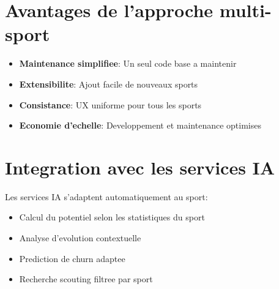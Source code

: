 \section{Avantages de l'approche multi-sport}

\begin{itemize}[leftmargin=*]
  \item \textbf{Maintenance simplifiee}: Un seul code base a maintenir
  \item \textbf{Extensibilite}: Ajout facile de nouveaux sports
  \item \textbf{Consistance}: UX uniforme pour tous les sports
  \item \textbf{Economie d'echelle}: Developpement et maintenance optimises
\end{itemize}

\section{Integration avec les services IA}

Les services IA s'adaptent automatiquement au sport:

\begin{itemize}[leftmargin=*]
  \item Calcul du potentiel selon les statistiques du sport
  \item Analyse d'evolution contextuelle
  \item Prediction de churn adaptee
  \item Recherche scouting filtree par sport
\end{itemize}